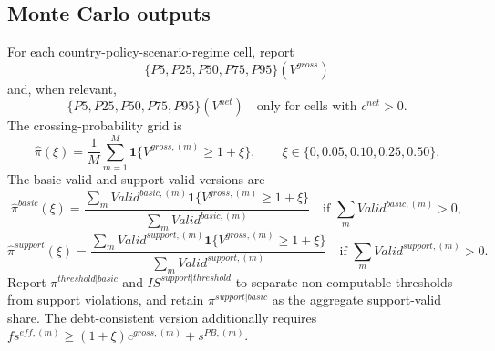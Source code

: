 \documentclass[11pt,a4paper]{article}
\begin{document}
\subsection{Monte Carlo outputs}

For each country-policy-scenario-regime cell, report
\begin{equation}
    \{P5,P25,P50,P75,P95\}(V^{gross})
\end{equation}
and, when relevant,
\begin{equation}
    \{P5,P25,P50,P75,P95\}(V^{net})\quad\text{only for cells with }c^{net}>0.
\end{equation}
The crossing-probability grid is
\begin{equation}
    \widehat{\pi}(\xi)=\frac{1}{M}\sum_{m=1}^{M}\mathbf{1}\{V^{gross,(m)}\geq1+\xi\},
    \qquad \xi\in\{0,0.05,0.10,0.25,0.50\}.
\end{equation}
The basic-valid and support-valid versions are
\begin{equation}
    \widehat{\pi}^{basic}(\xi)=
    \frac{\sum_m Valid^{basic,(m)}\mathbf{1}\{V^{gross,(m)}\geq1+\xi\}}
    {\sum_m Valid^{basic,(m)}}
    \quad\text{if }\sum_m Valid^{basic,(m)}>0,
\end{equation}
\begin{equation}
    \widehat{\pi}^{support}(\xi)=
    \frac{\sum_m Valid^{support,(m)}\mathbf{1}\{V^{gross,(m)}\geq1+\xi\}}
    {\sum_m Valid^{support,(m)}}
    \quad\text{if }\sum_m Valid^{support,(m)}>0.
\end{equation}
Report $\pi^{threshold|basic}$ and $IS^{support|threshold}$ to separate non-computable thresholds from support violations, and retain $\pi^{support|basic}$ as the aggregate support-valid share. The debt-consistent version additionally requires $fs^{eff,(m)}\geq(1+\xi)c^{gross,(m)}+s^{PB,(m)}$.
\end{document}
